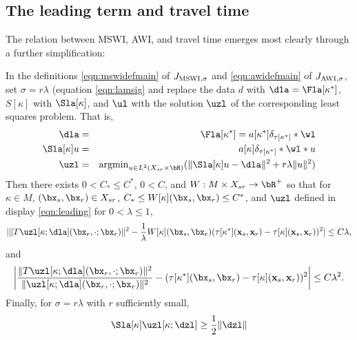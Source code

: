 \subsection{The leading term and travel time}

The relation between MSWI, AWI, and travel time emerges most clearly
through a further simplification:

\begin{prop}
  \label{thm:leading}
In the definitions \ref{eqn:mswidefmain} of $J_{\rm MSWI,\sigma}$ and
\ref{eqn:awidefmain} of $J_{\rm AWI,\sigma}$, set $\sigma = r\lambda$
(equation \ref{eqn:lamsig}
and replace the data $d$ with
$\dla = \Fla[\kappa^*]$, $S[\kappa]$ with $\Sla[\kappa]$, and $\ul$
with the solution $\uzl$ of the corresponding least squares problem. That is,
\begin{eqnarray}
  \label{eqn:leading}
  \dla & = & \Fla[\kappa^*] = a[\kappa^*]\delta_{\tau[\kappa^*]}*\wl
             \nonumber \\
  \Sla[\kappa]u &=& a[\kappa]\delta_{\tau[\kappa^*]}*\wl *u\nonumber
  \\
  \uzl &=& \mbox{argmin}_{u \in L^2(X_{sr} \times \bR)} (\|\Sla[\kappa]u-\dla\|^2 + r\lambda\|u\|^2)
\end{eqnarray}
Then there exists $0 < C_* \le C^*$, $0 < C$, and $W: M \times X_{sr}
\rightarrow \bR^+$ so that for
$\kappa \in M$, $(\bx_s,\bx_r) \in X_{sr}$, $C_* \le
W[\kappa](\bx_s,\bx_r) \le C^*$, and $\uzl$ defined in display
\ref{eqn:leading} for $0 < \lambda \le 1$, 
\begin{equation}
  \label{eqn:mswittz}
 | \|T\uzl[\kappa;\dla] (\bx_r,\cdot;\bx_r)\|^2- 
  \frac{1}{\lambda} W[\kappa](\bx_s,\bx_r) (\tau[\kappa^*]({\bf
  x}_s,{\bf x}_r)-\tau[\kappa]({\bf x}_s,{\bf x}_r))^2 | \le C\lambda,
\end{equation}
and
\begin{equation}
  \label{eqn:awittz}
  \left| \frac{\|T\uzl[\kappa;\dla] (\bx_r,\cdot;\bx_r)\|^2}{
        \|\uzl[\kappa;\dla] (\bx_r,\cdot;\bx_r)\|^2} - (\tau[\kappa^*](\bx_s,\bx_r)-\tau[\kappa]({\bf x}_s,{\bf x}_r))^2\right|  \le C\lambda^2.
\end{equation}
Finally, for $\sigma = r\lambda$ with $r$ sufficiently small,
\begin{equation}
  \label{eqn:Sutz}
  \Sla[\kappa]\uzl[\kappa;\dzl] \ge \frac{1}{2}\|\dzl\|
\end{equation}
\end{prop}

